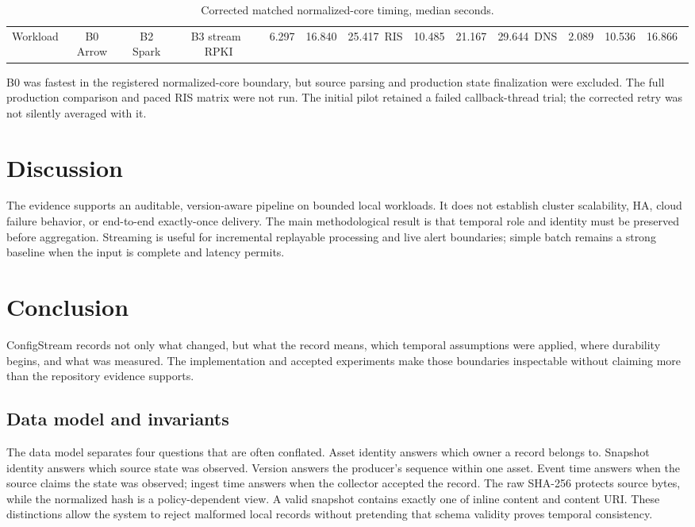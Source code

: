 \begin{table}[h]
\centering
\caption{Corrected matched normalized-core timing, median seconds.}
\label{tab:timing}
\begin{tabular}{lccc}
\toprule
Workload & B0 Arrow & B2 Spark & B3 stream\
\midrule
RPKI & 6.297 & 16.840 & 25.417\
RIS & 10.485 & 21.167 & 29.644\
DNS & 2.089 & 10.536 & 16.866\
\bottomrule
\end{tabular}
\end{table}

B0 was fastest in the registered normalized-core boundary, but source parsing and production state finalization were excluded. The full production comparison and paced RIS matrix were not run. The initial pilot retained a failed callback-thread trial; the corrected retry was not silently averaged with it.

\section{Discussion}
The evidence supports an auditable, version-aware pipeline on bounded local workloads. It does not establish cluster scalability, HA, cloud failure behavior, or end-to-end exactly-once delivery. The main methodological result is that temporal role and identity must be preserved before aggregation. Streaming is useful for incremental replayable processing and live alert boundaries; simple batch remains a strong baseline when the input is complete and latency permits.

\section{Conclusion}
ConfigStream records not only what changed, but what the record means, which temporal assumptions were applied, where durability begins, and what was measured. The implementation and accepted experiments make those boundaries inspectable without claiming more than the repository evidence supports.

\subsection{Data model and invariants}
The data model separates four questions that are often conflated. Asset identity answers which owner a record belongs to. Snapshot identity answers which source state was observed. Version answers the producer's sequence within one asset. Event time answers when the source claims the state was observed; ingest time answers when the collector accepted the record. The raw SHA-256 protects source bytes, while the normalized hash is a policy-dependent view. A valid snapshot contains exactly one of inline content and content URI. These distinctions allow the system to reject malformed local records without pretending that schema validity proves temporal consistency.

